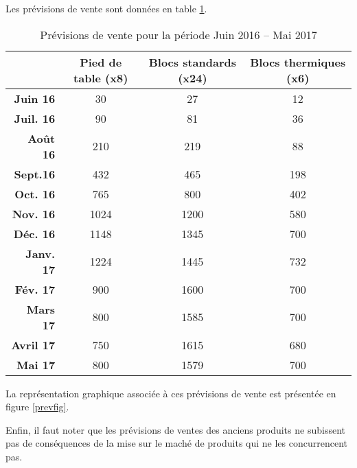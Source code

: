 Les prévisions de vente sont données en table \ref{prevVente}.
\begin{table}[!ht]
	\centering
	\begin{tabular}{>{\bfseries}rccc}
		\toprule
		& \textbf{Pied de table (x8)} & \textbf{Blocs standards (x24)} &
		\textbf{Blocs
		thermiques (x6)} \\
		\midrule
		Juin 16 & 30 & 27 & 12\\
		Juil. 16 & 90 & 81 & 36\\
		Août 16 & 210 & 219 & 88\\
		Sept.16 & 432 & 465 & 198 \\
		Oct. 16 & 765 & 800 & 402\\
		Nov. 16 & 1024 & 1200 & 580 \\
		Déc. 16 & 1148 & 1345 & 700 \\
		Janv. 17 & 1224 & 1445 & 732\\
		Fév. 17 & 900 & 1600 & 700\\
		Mars 17 & 800 & 1585 & 700\\
		Avril 17 & 750 & 1615 & 680\\
		Mai 17 & 800 & 1579 & 700\\
		\bottomrule
	\end{tabular}
	\caption{Prévisions de vente pour la période Juin 2016 -- Mai
	2017\label{prevVente}}
\end{table}

La représentation graphique associée à ces prévisions de vente est
présentée en figure \ref{prevfig}.


Enfin, il faut noter que les prévisions de ventes des anciens produits
ne subissent pas de conséquences de la mise sur le maché de produits qui
ne les concurrencent pas.
